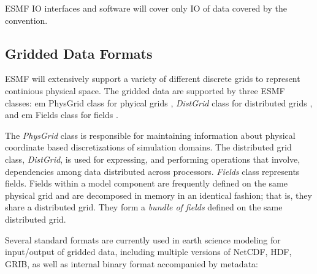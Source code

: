 ESMF IO interfaces and software will cover only IO of data covered by
the convention.




\subsection{Gridded Data Formats}

ESMF will extensively support a variety of different discrete grids to
represent continious physical space. The gridded data are supported by
three ESMF classes: {em PhysGrid} class for phyical grids
\cite{ESMF-PhysGrid-Req}, {\em DistGrid} class for distributed grids
\cite{ESMF-DistGrid-Req}, and {em Fields} class for fields
\cite{ESMF-Field-Req}. 

The {\em PhysGrid} class is responsible for maintaining information
about physical coordinate based discretizations of simulation domains. The
distributed grid class, {\em DistGrid}, is used for expressing, and
performing operations that involve, dependencies among data
distributed across processors. {\em Fields} class represents fields. 
Fields within a model component are frequently defined on the same
physical grid and are decomposed in memory in an identical fashion;
that is, they share a distributed grid. They form a {\em bundle of
fields} defined on the same distributed grid. 

Several standard formats are currently used in earth science modeling
for input/output of gridded data, including multiple versions of
NetCDF, HDF, GRIB, as well as internal binary format accompanied by
metadata:


